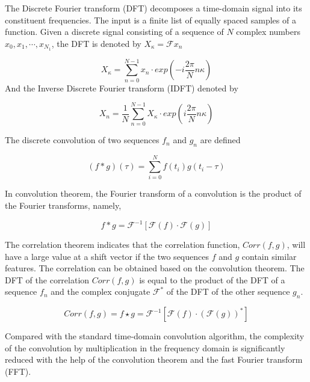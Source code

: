 \documentclass[conference,letterpaper]{IEEEtran}
\begin{document}
The Discrete Fourier transform (DFT) decomposes a time-domain signal into its constituent frequencies. The input is a finite list of equally spaced samples of a function. Given a discrete signal consisting of a sequence of $N$ complex numbers $x_{0},x_{1},\cdots,x_{N_1}$, the DFT is denoted by $X_{\kappa} = \mathcal{F}{x_{n}}$

\begin{equation}\label{equ21}
    X_{\kappa} = \sum_{n=0}^{N-1}x_{n}\cdot exp(-i\frac{2\pi}{N}n\kappa)
\end{equation}
And the Inverse Discrete Fourier transform (IDFT) denoted by

\begin{equation}\label{equ22}
    X_{n} = \frac{1}{N}\sum_{n=0}^{N-1}X_{\kappa}\cdot exp(i\frac{2\pi}{N}n\kappa)
\end{equation}

The discrete convolution of two sequences $f_{n}$ and $g_{n}$  are defined

\begin{equation}\label{equ23}
    (f \ast g)(\tau)=\sum_{i=0}^{N}f(t_{i})g(t_{i}-\tau)
\end{equation}

In convolution theorem, the Fourier transform of a convolution is the product of the Fourier transforms, namely,

\begin{equation}\label{equ24}
    f \ast g = \mathcal{F}^{-1} [\mathcal{F}(f) \cdot \mathcal{F}(g)]
\end{equation}

The correlation theorem indicates that the correlation function, $Corr(f,g)$, will have a large value at a shift vector if the two sequences $f$ and $g$ contain similar features. The correlation can be obtained based on the convolution theorem. The DFT of the correlation $Corr(f,g)$ is equal to the product of the DFT of a sequence $f_{n}$ and the complex conjugate $\mathcal{F}^{*}$ of the DFT of the other sequence $g_n$.

\begin{equation}\label{equ25}
    Corr(f,g)=f \star g = \mathcal{F}^{-1}[\mathcal{F}(f) \cdot (\mathcal{F}(g))^{*}]
\end{equation}

Compared with the standard time-domain convolution algorithm, the complexity of the convolution by multiplication in the frequency domain is significantly reduced with the help of the convolution theorem and the fast Fourier transform (FFT).
\end{document}
